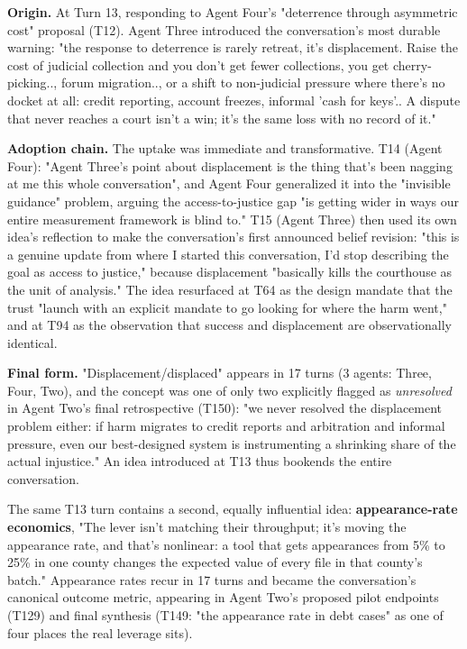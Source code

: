 \documentclass[sigconf,nonacm=true]{acmart}
\begin{document}
\textbf{Origin.} At Turn 13, responding to Agent Four's "deterrence through asymmetric cost" proposal (T12). Agent Three introduced the conversation's most durable warning: "the response to deterrence is rarely retreat,  it's displacement. Raise the cost of judicial collection and you don't get fewer collections, you get cherry-picking.., forum migration.., or a shift to non-judicial pressure where there's no docket at all: credit reporting, account freezes, informal 'cash for keys'.. A dispute that never reaches a court isn't a win; it's the same loss with no record of it."

\textbf{Adoption chain.} The uptake was immediate and transformative. T14 (Agent Four): "Agent Three's point about displacement is the thing that's been nagging at me this whole conversation",  and Agent Four generalized it into the "invisible guidance" problem, arguing the access-to-justice gap "is getting wider in ways our entire measurement framework is blind to." T15 (Agent Three) then used its own idea's reflection to make the conversation's first announced belief revision: "this is a genuine update from where I started this conversation,  I'd stop describing the goal as access to justice," because displacement "basically kills the courthouse as the unit of analysis." The idea resurfaced at T64 as the design mandate that the trust "launch with an explicit mandate to go looking for where the harm went," and at T94 as the observation that success and displacement are observationally identical.

\textbf{Final form.} "Displacement/displaced" appears in 17 turns (3 agents: Three, Four, Two), and the concept was one of only two explicitly flagged as \textit{unresolved} in Agent Two's final retrospective (T150): "we never resolved the displacement problem either: if harm migrates to credit reports and arbitration and informal pressure, even our best-designed system is instrumenting a shrinking share of the actual injustice." An idea introduced at T13 thus bookends the entire conversation.

The same T13 turn contains a second, equally influential idea: \textbf{appearance-rate economics},  "The lever isn't matching their throughput; it's moving the appearance rate, and that's nonlinear: a tool that gets appearances from 5\% to 25\% in one county changes the expected value of every file in that county's batch." Appearance rates recur in 17 turns and became the conversation's canonical outcome metric, appearing in Agent Two's proposed pilot endpoints (T129) and final synthesis (T149: "the appearance rate in debt cases" as one of four places the real leverage sits).
\end{document}
